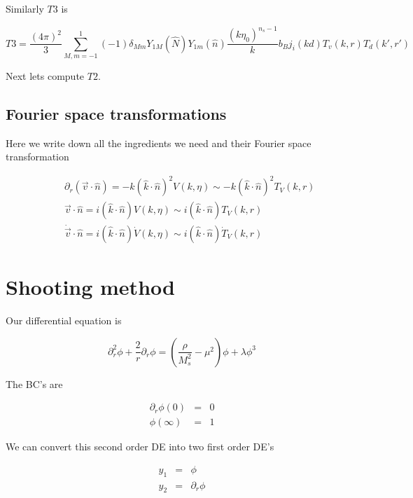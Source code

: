 \documentclass[aps,showpacs,onecolumn,floats,prd,superscriptaddress,nofootinbib]{revtex4-1}
\begin{document}
Similarly $T3$ is 

\begin{equation}
	T3 = \frac{(4 \pi)^2}{3} \sum^1_{M,m = -1} (-1) \delta_{Mm} Y_{1M} (\hat{N}) Y_{1m} (\hat{n}) \frac{(k \eta_0)^{n_s-1}}{k} b_B j_i(kd) T_v(k,r) T_d(k',r')
\end{equation}

Next lets compute $T2$. 

\subsection{Fourier space transformations}

Here we write down all the ingredients we need and their Fourier space transformation

\begin{eqnarray}
	& & \partial_r (\vec{v} \cdot \hat{n}) = -k (\hat{k} \cdot \hat{n})^2 V(k,\eta) \sim -k (\hat{k} \cdot \hat{n})^2 T_V(k,r) \nonumber \\
	& & \vec{v} \cdot \hat{n}  = i(\hat{k} \cdot \hat{n}) V(k,\eta) \sim  i(\hat{k} \cdot \hat{n}) T_V(k,r) \nonumber \\
	& & \dot{\vec{v}} \cdot \hat{n} = i (\hat{k} \cdot \hat{n}) \dot{V}(k, \eta) \sim i (\hat{k} \cdot \hat{n}) \dot{T}_V(k, r) 
\end{eqnarray}

\section{Shooting method}

Our differential equation is 

\begin{equation}
	\partial_r^2 \phi + \frac{2}{r} \partial_r \phi = \left( \frac{\rho}{M_s^2} - \mu^2 \right) \phi + \lambda \phi^3
\end{equation}

The BC's are 

\begin{eqnarray}
	\partial_r \phi(0) & = & 0 \nonumber	\\
	\phi(\infty) & = & 1
\end{eqnarray}

We can convert this second order DE into two first order DE's

\begin{eqnarray}
	y_1 & = & \phi	\nonumber	\\
	y_2 & = & \partial_r \phi
\end{eqnarray}
\end{document}
